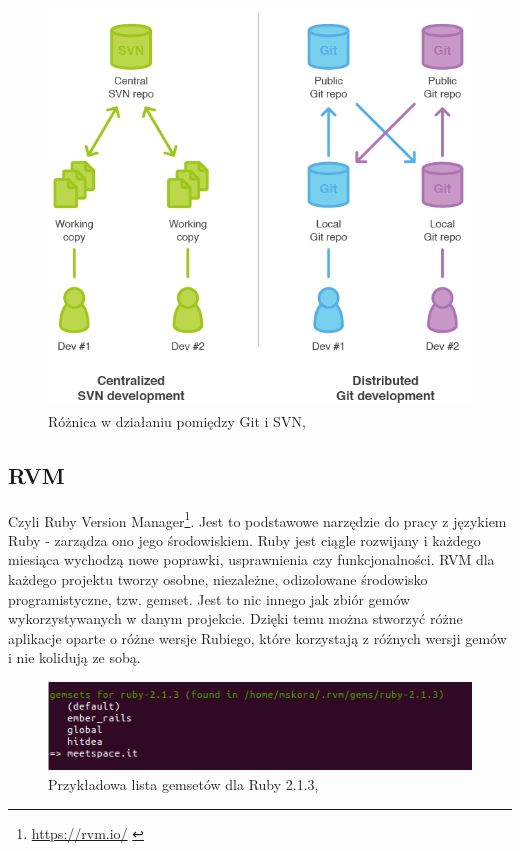   \begin{figure}
    \centering
    \includegraphics[scale=0.45]{images/gitsvn.png}
    \caption{Różnica w działaniu pomiędzy Git i SVN, \cite{git}}
  \end{figure}

  \subsection{RVM}
   \label{sec:RVM}
  Czyli Ruby Version Manager\footnote{\url{https://rvm.io/} \cite{programming_ruby}}. Jest to podstawowe narzędzie do pracy z językiem Ruby - zarządza ono jego środowiskiem. Ruby jest ciągle rozwijany i każdego miesiąca wychodzą nowe poprawki, usprawnienia czy funkcjonalności. RVM dla każdego projektu tworzy osobne, niezależne, odizolowane środowisko programistyczne, tzw. gemset. Jest to nic innego jak zbiór gemów wykorzystywanych w danym projekcie. Dzięki temu można stworzyć różne aplikacje oparte o różne wersje Rubiego, które korzystają z różnych wersji gemów i nie kolidują ze sobą.
  \begin{figure}[h]
  \centering
  \includegraphics[scale=0.84]{images/rvm.png}
  \caption{Przykładowa lista gemsetów dla Ruby 2.1.3, \cite{rubydoc}}
  \end{figure}

